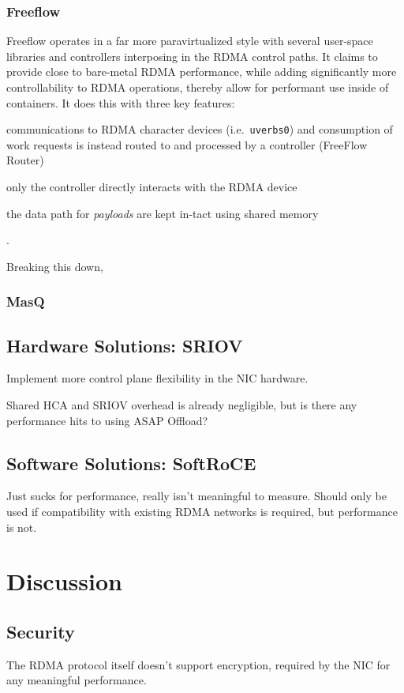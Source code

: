 \documentclass[12pt,titlepage]{article}
\begin{document}
\subsubsection{Freeflow}
Freeflow operates in a far more paravirtualized style with several user-space libraries and controllers interposing in the RDMA control paths.
It claims to provide close to bare-metal RDMA performance, while adding significantly more controllability to RDMA operations, thereby allow for performant use inside of containers.
It does this with three key features:
\begin{enumerate*}[label={(\arabic*)},itemjoin*={{, and }},itemjoin={{, }}]
   \item communications to RDMA character devices (i.e.\ \texttt{uverbs0}) and consumption of work requests is instead routed to and processed by a controller (FreeFlow Router)
   \item only the controller directly interacts with the RDMA device
   \item the data path for \textit{payloads} are kept in-tact using shared memory
\end{enumerate*}.

Breaking this down,




\subsubsection{MasQ}

\subsection{Hardware Solutions: SRIOV}
Implement more control plane flexibility in the NIC hardware.

Shared HCA and SRIOV overhead is already negligible, but is there any performance hits to using ASAP Offload?

\subsection{Software Solutions: SoftRoCE}
Just sucks for performance, really isn't meaningful to measure.
Should only be used if compatibility with existing RDMA networks is required, but performance is not.

\section{Discussion}
\subsection{Security}
The RDMA protocol itself doesn't support encryption, required by the NIC for any meaningful performance.
\end{document}
